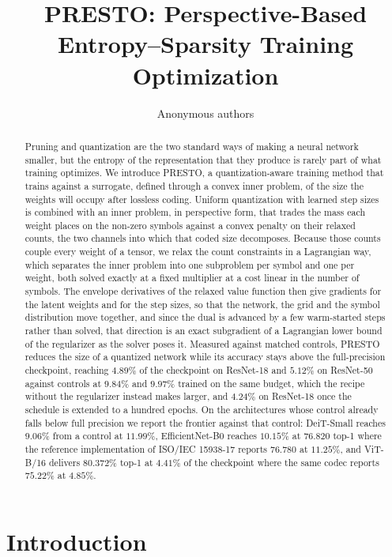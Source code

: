 \documentclass{article}
\title{PRESTO: Perspective-Based Entropy--Sparsity Training Optimization}
\author{Anonymous authors}
\begin{document}
\raggedbottom
\maketitle

\begin{abstract}
Pruning and quantization are the two standard ways of making a neural network
smaller, but the entropy of the representation that they produce is rarely part
of what training optimizes. We introduce PRESTO, a quantization-aware training
method that trains against a surrogate, defined through a convex inner problem, of
the size the weights will occupy after lossless coding. Uniform quantization with learned step sizes is combined
with an inner problem, in perspective form, that trades the mass each weight
places on the non-zero symbols against a convex penalty on their relaxed counts,
the two channels into which that coded size decomposes. Because those counts couple every weight of a
tensor, we relax the count constraints in a Lagrangian way, which separates the
inner problem into one subproblem per symbol and one per weight, both solved
exactly at a fixed multiplier at a cost linear in the number of symbols. The
envelope derivatives of the relaxed value function then give gradients for the
latent weights and for the step sizes, so that the network, the grid and the
symbol distribution move together, and since the dual is advanced by a few
warm-started steps rather than solved, that direction is an exact subgradient of a
Lagrangian lower bound of the regularizer as the solver poses it. Measured against matched controls,
PRESTO reduces the size of a quantized network while its accuracy stays above the
full-precision checkpoint, reaching $4.89\%$ of the checkpoint on ResNet-18 and
$5.12\%$ on ResNet-50 against controls at $9.84\%$ and $9.97\%$ trained on the same
budget, which the recipe without the regularizer instead makes larger, and
$4.24\%$ on ResNet-18 once the schedule is extended to a hundred epochs. On the
architectures whose control already falls below full precision we report
the frontier against that control: DeiT-Small reaches $9.06\%$ from a control at
$11.99\%$, EfficientNet-B0 reaches $10.15\%$ at $76.820$ top-1 where the
reference implementation of ISO/IEC 15938-17 reports $76.780$ at $11.25\%$, and
ViT-B/16 delivers $80.372\%$ top-1 at $4.41\%$ of the checkpoint where the same
codec reports $75.22\%$ at $4.85\%$.
\end{abstract}

\section{Introduction}
\label{sec:introduction}
\end{document}
